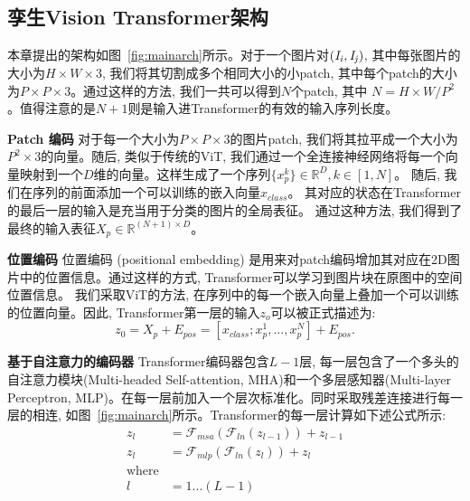 \subsection{孪生Vision Transformer架构}
本章提出的架构如图~\ref{fig:mainarch}所示。对于一个图片对$(\it{I}_i, \it{I}_j)$, 其中每张图片的大小为$H \times W \times 3$, 我们将其切割成多个相同大小的小patch, 其中每个patch的大小为$P \times P \times 3$。通过这样的方法, 我们一共可以得到$N$个patch, 其中  $N = H \times W / P^2$。值得注意的是$N+1$则是输入进Transformer的有效的输入序列长度。 \par
\textbf{Patch 编码} \quad 对于每一个大小为$P \times P \times 3$的图片patch, 我们将其拉平成一个大小为$P^2 \times 3$的向量。随后, 类似于传统的ViT, 我们通过一个全连接神经网络将每一个向量映射到一个$D$维的向量。这样生成了一个序列$\{x_p^k\} \in \mathbb{R}^{D}, k \in [1, N]$。 随后, 我们在序列的前面添加一个可以训练的嵌入向量$x_{class}$。 其对应的状态在Transformer的最后一层的输入是充当用于分类的图片的全局表征。 通过这种方法, 我们得到了最终的输入表征$X_p \in \mathbb{R}^{(N+1) \times D}$。\par
\textbf{位置编码} \quad 位置编码 (positional embedding) 是用来对patch编码增加其对应在2D图片中的位置信息。通过这样的方式, Transformer可以学习到图片块在原图中的空间位置信息。 我们采取ViT的方法, 在序列中的每一个嵌入向量上叠加一个可以训练的位置向量。因此, Transformer第一层的输入$z_o $可以被正式描述为:
\begin{equation}
    z_0 = X_p + E_{pos} = [x_{class}; x_p^1 , ... , x_p^N ] + E_{pos}.
\end{equation} \par
\textbf{基于自注意力的编码器} \quad
Transformer编码器包含$L-1$层, 每一层包含了一个多头的自注意力模块(Multi-headed Self-attention, MHA)和一个多层感知器(Multi-layer Perceptron, MLP)。在每一层前加入一个层次标准化。同时采取残差连接进行每一层的相连, 如图~\ref{fig:mainarch}所示。Transformer的每一层计算如下述公式所示:
\begin{equation}
    \begin{split}
        z_{l} &= \mathcal{F}_{msa}(\mathcal{F}_{ln}(z_{l-1})) + z_{l-1}   \\
      z_{l} &= \mathcal{F}_{mlp}(\mathcal{F}_{ln}(z_{l} )) + z_{l} \\
      \text{where} \\ l & = 1 ... (L-1)
    \end{split}
  \end{equation} \par
